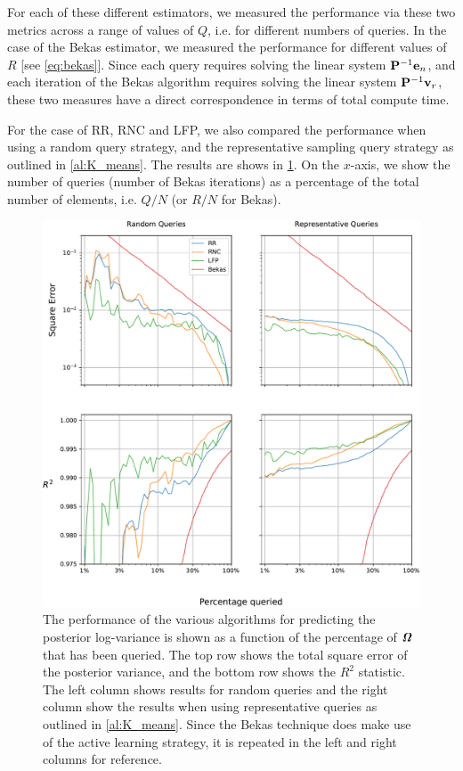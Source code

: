 For each of these different estimators, we measured the performance via these two metrics across a range of values of $Q$, i.e. for different numbers of queries. In the case of the Bekas estimator, we measured the performance for different values of $R$ [see \cref{eq:bekas}]. Since each query requires solving the linear system $\mathbf{P}^{-1}\mathbf{e}_n$, and each iteration of the Bekas algorithm requires solving the linear system $\mathbf{P}^{-1}\mathbf{v}_r$, these two measures have a direct correspondence in terms of total compute time. 

For the case of RR, RNC and LFP, we also compared the performance when using a random query strategy, and the representative sampling query strategy as outlined in \cref{al:K_means}. The results are shows in \cref{fig:var_solvers}. On the $x$-axis, we show the number of queries (number of Bekas iterations) as a percentage of the total number of elements, i.e. $Q/N$ (or $R/N$ for Bekas). 
 

\begin{figure}[t] 
    \begin{center}
        \includegraphics[width=\linewidth]{Figures/VarSolvers.pdf}
    \end{center}
   \caption[Performance of various algorithms for predicting the posterior log-variance]{The performance of the various algorithms for predicting the posterior log-variance is shown as a function of the percentage of $\bm{\mathit{\Omega}}$ that has been queried. The top row shows the total square error of the posterior variance, and the bottom row shows the $R^2$ statistic. The left column shows results for random queries and the right column show the results when using representative queries as outlined in \cref{al:K_means}. Since the Bekas technique does make use of the active learning strategy, it is repeated in the left and right columns for reference. } 
    \label{fig:var_solvers}
\end{figure} 

